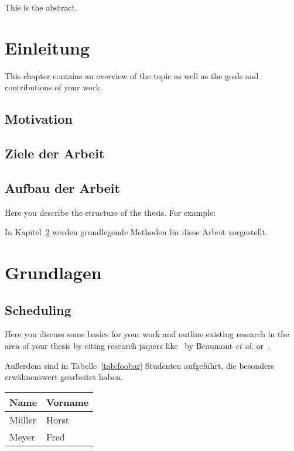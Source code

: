 \documentclass[
     12pt,                    %
     a4paper,             %
     BCOR10mm,     %
     DIV14,                 %
     listof=totoc,                    %
     bibliography=totoc,       %
     index=totoc,              %
     twoside,
     headsepline
     ]{scrreprt}
\begin{document}
This is the abstract.

\cleardoublepage

\tableofcontents
\cleardoublepage
{} 

\listoffigures
\listoftables
\cleardoublepage


\chapter{Einleitung}\label{intro}
This chapter contains an overview of the topic as well as the goals and contributions of your work.

\section{Motivation}

\section{Ziele der Arbeit}

\section{Aufbau der Arbeit}
Here you describe the structure of the thesis. For example:

In Kapitel~\ref{background} werden grundlegende Methoden für diese Arbeit vorgestellt.


\chapter{Grundlagen}\label{background}

\section{Scheduling}
Here you discuss some basics for your work and outline existing research in the area of your thesis by citing research papers like~\cite{BCFLMR_TPDS08} by Beaumont \textit{et al.} or~\cite{legrand_ccgrid03,TelBook}.

Außerdem sind in Tabelle~\ref{tab:foobar} Studenten aufgeführt, die besonders erwähnenswert gearbeitet haben.

\begin{table}[htb]
\centering
{}
\begin{tabular}{ll}
\hline
Name & Vorname \\
\hline
Müller  &  Horst \\
Meyer & Fred \\
\hline
\end{tabular}
\end{table}
\end{document}
